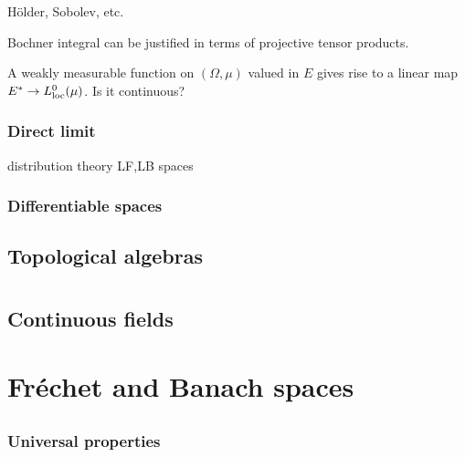 \documentclass{../../large}
\begin{document}
\begin{prb}
H\"older, Sobolev, etc.
\end{prb}


\begin{prb}
\end{prb}

\begin{prb}
Bochner integral can be justified in terms of projective tensor products.

A weakly measurable function on $(\Omega,\mu)$ valued in $E$ gives rise to a linear map $E^*\to L_{\mathrm{loc}}^0(\mu)$.
Is it continuous?
\end{prb}


	




\section{Direct limit}
distribution theory
LF,LB spaces
\section{Differentiable spaces}


\chapter{Topological algebras}

\part{}
\chapter{Continuous fields}


\part{Fr\'echet and Banach spaces}

\chapter{}
\section{Universal properties}
\end{document}
